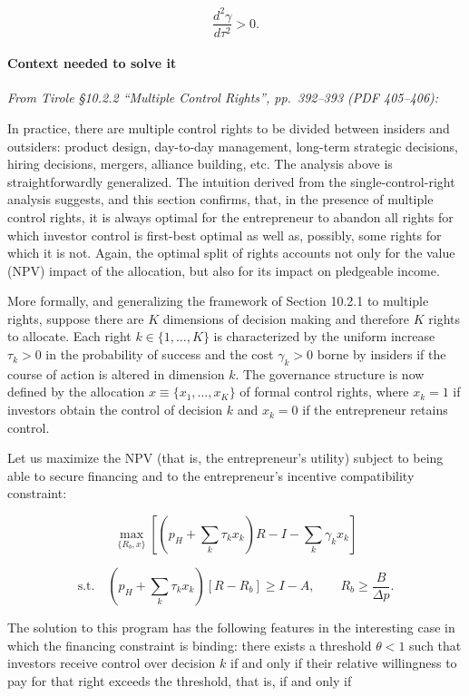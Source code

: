 \documentclass[11pt,a4paper]{article}
\begin{document}
\[\frac{d^2\gamma}{d\tau^2} > 0.\]

\paragraph{Context needed to solve it}

\emph{From Tirole §10.2.2 ``Multiple Control Rights'', pp.~392--393 (PDF 405--406):}

In practice, there are multiple control rights to be divided between insiders and outsiders: product
design, day-to-day management, long-term strategic decisions, hiring decisions, mergers, alliance
building, etc. The analysis above is straightforwardly generalized. The intuition derived from the
single-control-right analysis suggests, and this section confirms, that, in the presence of multiple
control rights, it is always optimal for the entrepreneur to abandon all rights for which investor
control is first-best optimal as well as, possibly, some rights for which it is not. Again, the
optimal split of rights accounts not only for the value (NPV) impact of the allocation, but also for
its impact on pledgeable income.

More formally, and generalizing the framework of Section 10.2.1 to multiple rights, suppose there
are \(K\) dimensions of decision making and therefore \(K\) rights to allocate. Each right
\(k \in \{1, \ldots, K\}\) is characterized by the uniform increase \(\tau_k > 0\) in the
probability of success and the cost \(\gamma_k > 0\) borne by insiders if the course of action is
altered in dimension \(k\). The governance structure is now defined by the allocation
\(x \equiv \{x_1, \ldots, x_K\}\) of formal control rights, where \(x_k = 1\) if investors obtain
the control of decision \(k\) and \(x_k = 0\) if the entrepreneur retains control.

Let us maximize the NPV (that is, the entrepreneur's utility) subject to being able to secure
financing and to the entrepreneur's incentive compatibility constraint:

\[\max_{\{R_b, x\}}\left[\left(p_H + \sum_k \tau_k x_k\right)R - I - \sum_k \gamma_k x_k\right]\]

\[\text{s.t.}\quad \left(p_H + \sum_k \tau_k x_k\right)[R - R_b] \geqslant I - A, \qquad R_b \geqslant \frac{B}{\Delta p}.\]

The solution to this program has the following features in the interesting case in which the
financing constraint is binding: there exists a threshold \(\theta < 1\) such that investors receive
control over decision \(k\) if and only if their relative willingness to pay for that right exceeds
the threshold, that is, if and only if
\end{document}
